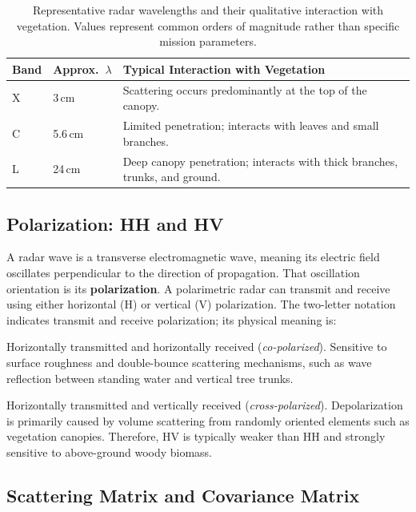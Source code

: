 \documentclass[11pt,a4paper]{article}
\begin{document}
\begin{table}[htbp]
\centering\small
\begin{tabularx}{\linewidth}{p{.12\linewidth}p{.17\linewidth}X}
\toprule
\textbf{Band} & \textbf{Approx.\ $\lambda$} & \textbf{Typical Interaction with Vegetation}\\\midrule
X & 3\,cm & Scattering occurs predominantly at the top of the canopy.\\
C & 5.6\,cm & Limited penetration; interacts with leaves and small branches.\\
L & 24\,cm & Deep canopy penetration; interacts with thick branches, trunks, and ground.\\\bottomrule
\end{tabularx}
\caption{Representative radar wavelengths and their qualitative interaction with vegetation. Values represent
common orders of magnitude rather than specific mission parameters.}
\label{tab:bandas}
\end{table}

\subsection{Polarization: HH and HV}

A radar wave is a transverse electromagnetic wave, meaning its electric field oscillates perpendicular to the direction of propagation. That oscillation orientation is its \textbf{polarization}. A polarimetric radar can transmit and receive using either horizontal (H) or vertical (V) polarization. The two-letter notation indicates transmit and receive polarization; its physical meaning is:
\begin{description}[style=nextline]
  \item[HH] Horizontally transmitted and horizontally received (\emph{co-polarized}). Sensitive
        to surface roughness and double-bounce scattering mechanisms, such as wave reflection between standing water and vertical tree trunks.
  \item[HV] Horizontally transmitted and vertically received (\emph{cross-polarized}). Depolarization is primarily caused by volume scattering from randomly oriented elements such as vegetation canopies. Therefore, HV is typically weaker than HH and strongly sensitive to above-ground woody biomass.
\end{description}

\subsection{Scattering Matrix and Covariance Matrix}
\end{document}
